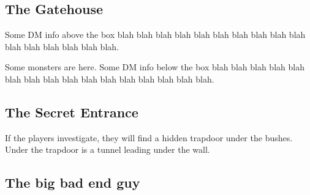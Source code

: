 \documentclass[a4paper,serif]{module}       %
\begin{document}
\subsection{The Gatehouse}

Some DM info above the box blah blah blah blah blah blah blah blah blah blah blah blah blah blah blah blah.


Some monsters are here.
Some DM info below the box blah blah blah blah blah blah blah blah blah blah blah blah blah blah blah blah.

\subsection{The Secret Entrance}


If the players investigate, they will find a hidden trapdoor under the bushes. Under the trapdoor is a tunnel leading under the wall.

\subsection{The big bad end guy}
\end{document}
